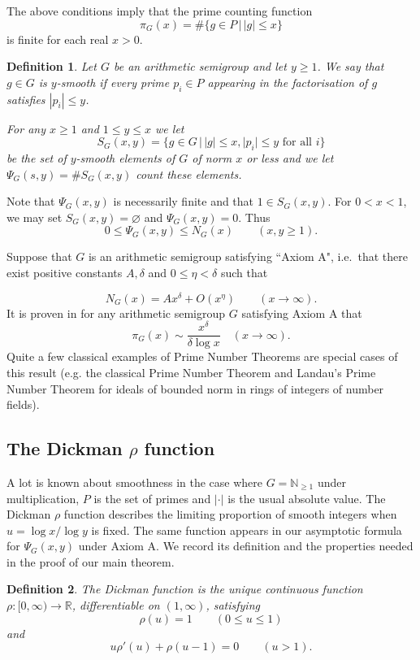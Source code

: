 \documentclass[10pt,a4paper]{amsart}
\newtheorem{definition}{Definition}[section]
\begin{document}
The above conditions imply that the prime counting function \[\pi_G(x) = \#\{g\in P\,|\, |g|\le x\}\] is finite for each real $x>0$.\\

 \begin{definition} \label{def:smooth}
Let $G$ be an arithmetic semigroup and let $y\geq 1$. We say that $g\in G$ is $y$-smooth if every prime $p_i\in P$ appearing in the factorisation of $g$ satisfies $|p_i| \leq y$.

\noindent For any $x\geq 1$  and $1 \leq y \leq x$ we let \[S_G(x,y) = \{g\in G\,|\, |g|\leq x, |p_i|\leq y \text{ for all } i\}\] be the set of $y$-smooth elements of $G$ of norm $x$ or less and we let $\Psi_G(s,y) = \#S_G(x,y)$ count these elements.
\end{definition}

Note that $\Psi_G(x,y)$ is necessarily finite and that $1\in S_G(x,y)$. For $0<x<1$, we may set
$S_G(x,y)=\varnothing$ and $\Psi_G(x,y)=0$. Thus
\[
0\le\Psi_G(x,y)\le N_G(x)
\qquad(x,y\ge1).
\] 

Suppose that $G$ is an arithmetic semigroup satisfying ``Axiom A", i.e.\ that there exist positive constants $A,\delta$ and $0\leq \eta < \delta$ such that 

        \begin{equation}\label{axiom}
        N_G(x) = Ax^{\delta} + O(x^{\eta})\qquad(x\to\infty).
        \end{equation}
        It is proven in \cite[Chapter VI]{knopfmacher2015abstract} for any arithmetic semigroup $G$ satisfying Axiom A that
        \begin{equation}\label{primecounting}
    \pi_G(x)\sim\frac{x^\delta}{\delta\log x}\quad(x\rightarrow\infty).
        \end{equation}
        Quite a few classical examples of Prime Number Theorems are special cases of this result (e.g. the classical Prime Number Theorem and Landau's Prime Number Theorem \cite{landau2010einfuhrung} for ideals of bounded norm in rings of integers of number fields).

\subsection{The Dickman \texorpdfstring{$\rho$}{rho} function}
A lot is known about smoothness in the case where $G = \mathbb{N}_{\geq 1}$ under multiplication, $P$ is the set of primes and $|\cdot|$ is the usual absolute value.
The Dickman $\rho$ function describes the limiting proportion of smooth integers when $u=\log x/\log y$ is fixed. The same function appears in our asymptotic formula for $\Psi_G(x,y)$ under Axiom A. We record its definition and the properties needed in the proof of our main theorem.
\begin{definition}\label{def:dickman}
The Dickman function is the unique continuous function
$\rho:[0,\infty)\to\mathbb R$, differentiable on
$(1,\infty)$, satisfying
\[
\rho(u)=1\qquad(0\le u\le1)
\]
and
\[
u\rho'(u)+\rho(u-1)=0\qquad(u>1).
\]
\end{definition}
\end{document}
